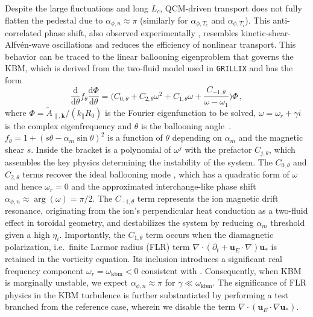 \documentclass[aps,prl,twocolumn,superscriptaddress]{revtex4-2}
\def  \grillix {\texttt{GRILLIX}{}}
\begin{document}
Despite the large fluctuations and long $L_c$, QCM-driven transport does not fully flatten the pedestal due to $\alpha_{\phi,n}\approx \pi$ (similarly for $\alpha_{\phi,T_e}$ and $\alpha_{\phi,T_i}$).
This anti-correlated phase shift, also observed experimentally \cite{grenfell2024multi}, resembles kinetic-shear-Alfv\'en-wave oscillations \cite{scott2021turbulence} and reduces the efficiency of nonlinear transport.
This behavior can be traced to the linear ballooning eigenproblem that governs the KBM,
which is derived from the two-fluid model used in \grillix{} and has the form
\begin{equation} \label{eqn:kbm:sim_eqn}
    \frac{\mathrm{d}}{\mathrm{d} \theta } f_{\theta}\frac{\mathrm{d}\Phi}{\mathrm{d} \theta } = \bigg(
    C_{0,\theta} + C_{2,\theta} {\omega}^2+ C_{1,\theta} {\omega}+\frac{C_{-1,\theta}}{{\omega}-{\omega}_1}\bigg)\Phi\,,
\end{equation}
where $\Phi={\tilde{A}_{\parallel,\mathbf{k}}}/({k_\parallel R_0 })$ is the Fourier eigenfunction to be solved, $\omega=\omega_r+\gamma i$ is the complex eigenfrequency and $\theta$ is the ballooning angle~\cite{connor1978shear}. $f_{\theta}=1+(s \theta-\alpha_m \sin \theta)^2$ is a function of $\theta$ depending on $\alpha_m$ and the magnetic shear $s$.
Inside the bracket is a polynomial of $\omega^j$ with the prefactor $C_{j,\theta}$, which assembles the key physics determining the instability of the system.
The $C_{0,\theta}$ and $C_{2,\theta}$ terms recover the ideal ballooning mode \cite{connor1978shear},
which has a quadratic form of $\omega$ and hence $\omega_r=0$ and the approximated interchange-like phase shift $\alpha_{\phi,n} \approx \arg(\omega) = \pi/2$.
The $C_{-1,\theta}$ term represents the ion magnetic drift resonance, originating from the ion's perpendicular heat conduction as a two-fluid effect in toroidal geometry, and destabilizes the system by reducing $\alpha_m$ threshold given a high $\eta_i$.
Importantly, the $C_{1,\theta}$ term occurs when the diamagnetic polarization, i.e.~finite Larmor radius (FLR) term $\nabla\cdot (\partial_t+\mathbf{u}_{E} \cdot \nabla ) \mathbf{u}_{*}$ is retained in the vorticity equation.
Its inclusion introduces a significant real frequency component $\omega_r=\omega_{\mathrm{kbm}}<0$ consistent with \cite{aleynikova2017quantitative}.
Consequently, when KBM is marginally unstable, we expect $\alpha_{\phi,n}\approx \pi$ for $\gamma \ll \omega_{\mathrm{kbm}}$.
The significance of FLR physics in the KBM turbulence is further substantiated by performing a test branched from the reference case, wherein we disable the term $\nabla\cdot(\mathbf{u}_{E} \cdot \nabla \mathbf{u}_{*})$.
\end{document}
